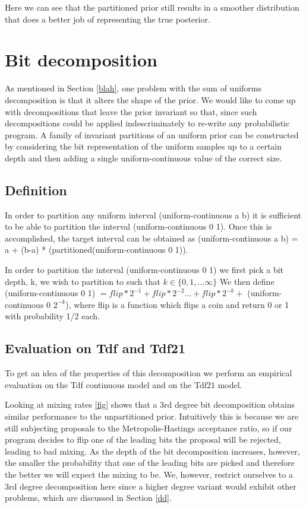 Here we can see that the partitioned prior still results in a smoother distribution that does a better job of representing the true posterior.

\section{Bit decomposition}
As mentioned in Section \ref{blah}, one problem with the sum of uniforms decomposition is that it alters the shape of the prior. We would like to come up with decompositions that leave the prior invariant so that, since such decompositions could be applied indescriminately to re-write any probabilistic program. A family of invariant partitions of an uniform prior can be constructed by considering the bit representation of the uniform samples up to a certain depth and then adding a single uniform-continuous value of the correct size.

\subsection{Definition}
In order to partition any uniform interval (uniform-continuous a b) it is sufficient to be able to partition the interval (uniform-continuous 0 1). Once this is accomplished, the target interval can be obtained as (uniform-continuous a b) = a + (b-a) * (partitioned(uniform-continuous 0 1)).

In order to partition the interval (uniform-continuous 0 1) we first pick a bit depth, k, we wish to partition to such that $ k \in \{ 0, 1, \ldots \infty \} $ We then define (uniform-continuous 0 1) $= flip*2^{-1} + flip*2^{-2} \ldots + flip*2^{-k} +$ (uniform-continuous 0 $2^{-k}$), where flip is a function which flips a coin and return 0 or 1 with probability 1/2 each.

\subsection{Evaluation on Tdf and Tdf21}

To get an idea of the properties of this decomposition we perform an empirical evaluation on the Tdf continuous model and on the Tdf21 model.

Looking at mixing rates \ref{fig} shows that a 3rd degree bit decomposition obtains similar performance to the unpartitioned prior. Intuitively this is because we are still subjecting proposals to the Metropolis-Hastings acceptance ratio, so if our program decides to flip one of the leading bits the proposal will be rejected, leading to bad mixing. As the depth of the bit decomposition increases, however, the smaller the probability that one of the leading bits are picked and therefore the better we will expect the mixing to be.  We, however, restrict ourselves to a 3rd degree decomposition here since a higher degree variant would exhibit other problems, which are discussed in Section \ref{dd}.

